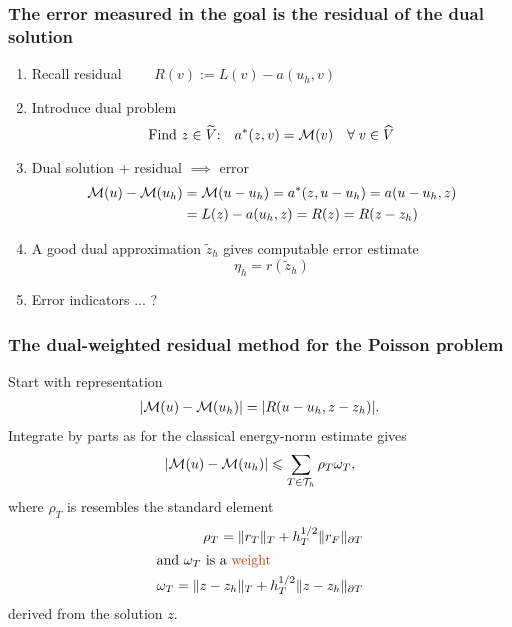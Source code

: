 \begin{frame}
  \frametitle{The error measured in the goal is the residual of the
    dual solution}
  \begin{enumerate}
    \item Recall residual
      $\qquad
    R(v) := L(v) - a(u_h, v)
    $
\item Introduce dual problem
    \vspace{-0.5em}
  \begin{equation*}
    \text{Find $z \in \widetilde{V}$:}  \quad a^* (z, v) = \mathcal{M}(v)
    \quad \forall \; v \in \widehat{V}
  \end{equation*}
  \item Dual solution + residual $\implies$ error
    \vspace{-0.5em}
    \begin{align*}
      \mathcal{M}(u) - \mathcal{M}(u_h)
      &=\mathcal{M}(u - u_h)
      =a^{\ast}(z,u-u_h)
      =a(u-u_h, z)
      \\
      &= L(z) - a(u_h, z)
      = R(z) 
      = R(z - z_h)
  \end{align*}
  \item A good dual approximation $\tilde z_h$ gives computable error
    estimate
    \vspace{-1.8em}
    \begin{equation*}
      \eta_h = r(\tilde z_h)
    \end{equation*}
  \item Error indicators ... ?
  \end{enumerate}

\end{frame}
\begin{frame}
  \frametitle{The dual-weighted residual method for the Poisson
  problem}
  Start with representation
  \begin{align*}
    |\mathcal{M}(u) - \mathcal{M}(u_h)| = |R(u-u_h,z-z_h)|.
  \end{align*}
  Integrate by parts as for the classical energy-norm estimate gives  
  \begin{align*}
    |\mathcal{M}(u) - \mathcal{M}(u_h) | 
    \leqslant \sum_{T \in \mathcal{T}_h} \rho_T \omega_T,
  \end{align*}
  where $\rho_T$ is resembles the standard element 
  \vspace{-0.5em}
  \begin{align*}
    \rho_T = \| r_T \|_T + h^{1/2}_T \| r_F \|_{\partial T}\\
    \intertext{and $\omega_T$ is a \colemph{weight}}
    \omega_T = \| z - z_h \|_T + h^{1/2}_T \| z - z_h \|_{\partial T}
  \end{align*}
  derived from the  solution $z$.
  
\end{frame}

